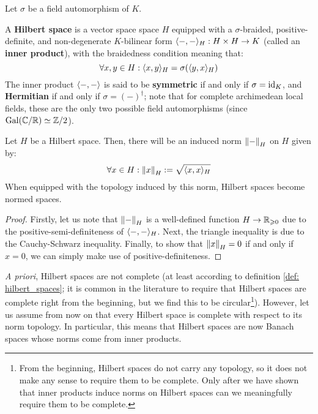         \begin{definition} \label{def: hilbert_spaces}
            Let $\sigma$ be a field automorphism of $K$.
        
            A \textbf{Hilbert space} is a vector space space $H$ equipped with a $\sigma$-braided, positive-definite, and non-degenerate $K$-bilinear form $\<-, -\>_H: H \x H \to K$ (called an \textbf{inner product}), with the braidedness condition meaning that:
                $$\forall x, y \in H: \langle x, y\rangle_H = \sigma( \langle y, x\rangle_H )$$
            The inner product $\langle-, -\rangle$ is said to be \textbf{symmetric} if and only if $\sigma = \mathrm{id}_K$, and \textbf{Hermitian} if and only if $\sigma = (-)^{\dagger}$; note that for complete archimedean local fields, these are the only two possible field automorphisms (since $\mathrm{Gal}(\mathbb{C}/\mathbb{R}) \simeq \mathbb{Z}/2$). 
        \end{definition}
        \begin{proposition} \label{prop: induced_norms_on_hilbert_spaces}
            Let $H$ be a Hilbert space. Then, there will be an induced norm $\left\| {-} \right\|_H$ on $H$ given by:
                $$\forall x \in H: \left\| {x} \right\|_H := \sqrt{\langle x, x\rangle_H}$$
            When equipped with the topology induced by this norm, Hilbert spaces become normed spaces. 
        \end{proposition}
            \begin{proof}
                Firstly, let us note that $\left\| {-} \right\|_H$ is a well-defined function $H \to \mathbb{R}_{\geqslant 0}$ due to the positive-semi-definiteness of $\langle-, -\rangle_H$. Next, the triangle inequality is due to the Cauchy-Schwarz inequality. Finally, to show that $\left\| {x} \right\|_H = 0$ if and only if $x = 0$, we can simply make use of positive-definiteness.
            \end{proof}
        \begin{convention}
            \textit{A priori}, Hilbert spaces are not complete (at least according to definition \ref{def: hilbert_spaces}; it is common in the literature to require that Hilbert spaces are complete right from the beginning, but we find this to be circular\footnote{From the beginning, Hilbert spaces do not carry any topology, so it does not make any sense to require them to be complete. Only after we have shown that inner products induce norms on Hilbert spaces can we meaningfully require them to be complete.}). However, let us assume from now on that every Hilbert space is complete with respect to its norm topology. In particular, this means that Hilbert spaces are now Banach spaces whose norms come from inner products.
        \end{convention}
